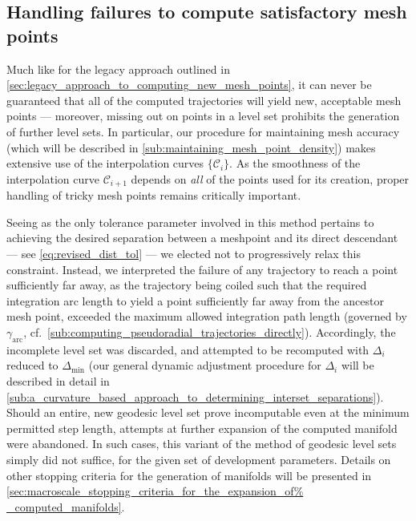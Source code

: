 \subsection{Handling failures to compute satisfactory mesh points}
\label{sub:handling_failures_to_compute_satisfactory_mesh_points_revised}

Much like for the legacy approach outlined in
\cref{sec:legacy_approach_to_computing_new_mesh_points}, it can never be
guaranteed that all of the computed trajectories will yield new, acceptable
mesh points --- moreover, missing out on points in a level set prohibits
the generation of further level sets. In particular, our procedure for
maintaining mesh accuracy (which will be described in
\cref{sub:maintaining_mesh_point_density}) makes extensive use of the
interpolation curves $\{\mathcal{C}_{i}\}$. As the smoothness of the
interpolation curve $\mathcal{C}_{i+1}$ depends on \emph{all} of the points
used for its creation, proper handling of tricky mesh points remains critically
important.

Seeing as the only tolerance parameter involved in this method pertains to
achieving the desired separation between a meshpoint and its direct descendant
--- see \cref{eq:revised_dist_tol} --- we elected not to progressively relax
this constraint. Instead, we interpreted the failure of any trajectory to reach
a point sufficiently far away, as the trajectory being coiled such that the
required integration arc length to yield a point sufficiently far away from
the ancestor mesh point, exceeded the maximum allowed integration path
length (governed by $\gamma_{\text{arc}}$, cf.\
\cref{sub:computing_pseudoradial_trajectories_directly}). Accordingly, the
incomplete level set was discarded, and attempted to be recomputed with
$\Delta_{i}$ reduced to $\Delta_{\min}$ (our general dynamic adjustment
procedure for $\Delta_{i}$ will be described in detail in
\cref{sub:a_curvature_based_approach_to_determining_interset_separations}).
Should an entire, new geodesic level set prove incomputable even at the
minimum permitted step length, attempts at further expansion of the computed
manifold were abandoned. In such cases, this variant of the method of geodesic
level sets simply did not suffice, for the given set of development parameters.
Details on other stopping criteria for the generation of manifolds will be
presented in \cref{sec:macroscale_stopping_criteria_for_the_expansion_of%
_computed_manifolds}.

